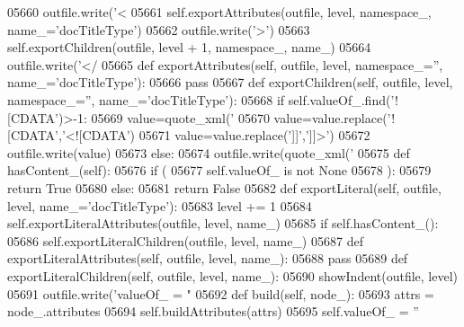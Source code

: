\begin{DoxyCode}
{{{{{{{{{{{{{{{{{{{{{{{{{{{{{{{{{{{{{{{{{{{{{{{{{{{{{{{{{{{{{{{{{{{{{{{{{{{{{{{{{{{{{{{{{{{{{{{{{{{{{{{{{{{{{{{{{{{{{{{{{{{{{{{{{{{{{{{{{{{{{{{{{{{{{{{{{{{{{{{{{{{{{{{{{{{{{{{{{{{{{{{{{{{{{{{{{{{{{{{{{{{{{{{{{{{{{{{{{{{{{{{{{{{{{{{{{{{{{{{{{{{{{{{{{{{{{{{{{{{{{{{{{{{{{{{{{{{{{{{{{{{{{{{{{{{{{{{{{{{{{{{{{{{{{{{{{{{{{{{{{{{{{{{{{{{{{{{{{{{{{{{{{{05660         outfile.write(\textcolor{stringliteral}{'<%
05661         self.exportAttributes(outfile, level, namespace\_, name\_=\textcolor{stringliteral}{'docTitleType'})
05662         outfile.write(\textcolor{stringliteral}{'>'})
05663         self.exportChildren(outfile, level + 1, namespace\_, name\_)
05664         outfile.write(\textcolor{stringliteral}{'</%
05665     \textcolor{keyword}{def }exportAttributes(self, outfile, level, namespace\_='', name\_='docTitleType'):
05666         \textcolor{keywordflow}{pass}
05667     \textcolor{keyword}{def }exportChildren(self, outfile, level, namespace\_='', name\_='docTitleType'):
05668         \textcolor{keywordflow}{if} self.valueOf\_.find(\textcolor{stringliteral}{'![CDATA'})>-1:
05669             value=quote_xml(\textcolor{stringliteral}{'%
05670             value=value.replace(\textcolor{stringliteral}{'![CDATA'},\textcolor{stringliteral}{'<![CDATA'})
05671             value=value.replace(\textcolor{stringliteral}{']]'},\textcolor{stringliteral}{']]>'})
05672             outfile.write(value)
05673         \textcolor{keywordflow}{else}:
05674             outfile.write(quote_xml(\textcolor{stringliteral}{'%
05675     \textcolor{keyword}{def }hasContent_(self):
05676         \textcolor{keywordflow}{if} (
05677             self.valueOf_ \textcolor{keywordflow}{is} \textcolor{keywordflow}{not} \textcolor{keywordtype}{None}
05678             ):
05679             \textcolor{keywordflow}{return} \textcolor{keyword}{True}
05680         \textcolor{keywordflow}{else}:
05681             \textcolor{keywordflow}{return} \textcolor{keyword}{False}
05682     \textcolor{keyword}{def }exportLiteral(self, outfile, level, name\_='docTitleType'):
05683         level += 1
05684         self.exportLiteralAttributes(outfile, level, name\_)
05685         \textcolor{keywordflow}{if} self.hasContent_():
05686             self.exportLiteralChildren(outfile, level, name\_)
05687     \textcolor{keyword}{def }exportLiteralAttributes(self, outfile, level, name\_):
05688         \textcolor{keywordflow}{pass}
05689     \textcolor{keyword}{def }exportLiteralChildren(self, outfile, level, name\_):
05690         showIndent(outfile, level)
05691         outfile.write(\textcolor{stringliteral}{'valueOf\_ = "%
05692     \textcolor{keyword}{def }build(self, node\_):
05693         attrs = node\_.attributes
05694         self.buildAttributes(attrs)
05695         self.valueOf_ = \textcolor{stringliteral}{''}
}}}}}}}}}}}}}}}}}}}}}}}}}}}}}}}}}}}}}}}}}}}}}}}}}}}}}}}}}}}}}}}}}}}}}}}}}}}}}}}}}}}}}}}}}}}}}}}}}}}}}}}}}}}}}}}}}}}}}}}}}}}}}}}}}}}}}}}}}}}}}}}}}}}}}}}}}}}}}}}}}}}}}}}}}}}}}}}}}}}}}}}}}}}}}}}}}}}}}}}}}}}}}}}}}}}}}}}}}}}}}}}}}}}}}}}}}}}}}}}}}}}}}}}}}}}}}}}}}}}}}}}}}}}}}}}}}}}}}}}}}}}}}}}}}}}}}}}}}}}}}}}}}}}}}}}}}}}}}}}}}}}}}}}}}}}}}}}}}}}}}}}}}}}}}}}
\end{DoxyCode}
